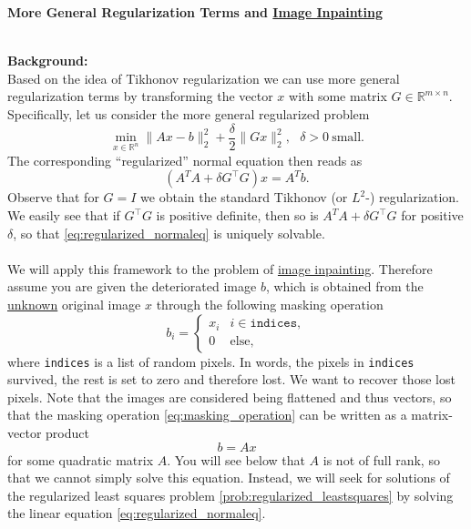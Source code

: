 \textbf{\normalsize More General Regularization Terms and \hyperref{https://en.wikipedia.org/wiki/Inpainting}{}{}{Image Inpainting}}

~\\
{\color{navy}
	\textbf{Background:}\\
	Based on the idea of Tikhonov regularization we can use more general regularization terms by transforming the vector $x$ with some matrix $G\in\mathbb{R}^{m \times n}$. Specifically, let us consider the more general regularized problem
	\begin{equation} \label{prob:regularized_leastsquares}
	\min_{x\in \mathbb{R}^n} \|Ax-b\|_2^2 + \frac{\delta}{2}\|Gx\|_2^2,~~~\delta > 0 ~\text{small}.
	\end{equation}
	The corresponding ``regularized'' normal equation then reads as 
	\begin{equation}\label{eq:regularized_normaleq}
	(A^TA  + \delta G^\top G)x = A^Tb. 
	\end{equation}
	Observe that for $G = I$ we obtain the standard Tikhonov (or $L^2$-) regularization. We easily see that if $G^\top G$ is positive definite, then so is $A^TA  + \delta G^\top G$ for positive $\delta$, so that \eqref{eq:regularized_normaleq} is uniquely solvable.\\~\\ 
	We will apply this framework to the problem of \hyperref{https://en.wikipedia.org/wiki/Inpainting}{}{}{image inpainting}. Therefore assume you are given the deteriorated image $b$, which is obtained from the \underline{unknown} original image $x$ through the following masking operation
	\begin{equation} \label{eq:masking_operation}
		b_i = \begin{cases}
		x_i & i \in \texttt{indices},\\
		0 & \text{else},
		\end{cases}
	\end{equation}
	where \texttt{indices} is a list of random pixels. In words, the pixels in \texttt{indices} survived, the rest is set to zero and therefore lost. We want to recover those lost pixels. Note that the images are considered being flattened and thus vectors, so that the masking operation \eqref{eq:masking_operation} can be written as a matrix-vector product
	$$b = Ax $$
	for some quadratic matrix $A$. You will see below that $A$ is not of full rank, so that we cannot simply solve this equation. Instead, we will seek for solutions of the regularized least squares problem \eqref{prob:regularized_leastsquares} by solving the linear equation \eqref{eq:regularized_normaleq}. 
}
